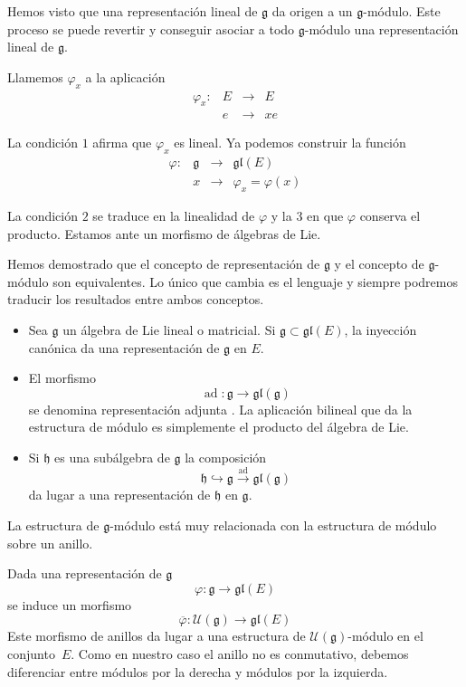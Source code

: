 \documentclass[a4paper,draft,12pt]{article}
\newcommand{\g}{\mathfrak{g}}%
\newcommand{\uni}{\mathcal{U}}%
\newcommand{\lto}{\longrightarrow}%
\newcommand{\df}[1]{\textsf{\color{blue}#1}}
\DeclareMathOperator{\ad}{ad}  %
\begin{document}
Hemos visto que una representación lineal de $\g$ da origen a un $\g$-módulo.  Este proceso se  puede revertir y conseguir asociar a todo $\g$-módulo una representación lineal de $\g$.

Llamemos $\varphi_x$ a la aplicación
$$
\begin{array}{cccl}
\varphi_x :&  E & \lto & E \\
  & e & \lto & xe
\end{array}
$$

La condición $1$ afirma que $\varphi_x$ es lineal. Ya podemos construir la función
$$
\begin{array}{cccl}
\varphi :&  \g & \lto & \mathfrak{gl}(E) \\
  & x & \lto & \varphi_x=\varphi(x)
\end{array}
$$

La condición $2$ se traduce en la linealidad de $\varphi$ y la $3$ en que $\varphi$ conserva el producto.  Estamos ante un morfismo de álgebras de Lie.

Hemos demostrado que el concepto de representación de $\g$ y el concepto de $\g$-módulo son equivalentes.  Lo único que cambia es el lenguaje y siempre podremos traducir los resultados entre ambos conceptos.

\bigskip


\begin{itemize}

\item Sea $\g$ un álgebra de Lie lineal o matricial.  Si $\g \subset \mathfrak{gl}(E)$, la inyección canónica  da una representación de $\g$ en $E$.

\item El morfismo
$$
\ad: \g \lto \mathfrak{gl}(\g)
$$
se denomina   \df{representación adjunta} .  La aplicación bilineal que da la estructura de módulo es simplemente el producto del álgebra de Lie.

\item Si $\mathfrak{h}$ es una subálgebra de $\g$ la composición
$$
\mathfrak{h} \hookrightarrow \g \stackrel{\ad}{\lto} \mathfrak{gl}(\g)
$$
da lugar a una representación de $\mathfrak{h}$ en $\g$.

\end{itemize}

La estructura de $\g$-módulo está muy relacionada con la estructura de módulo sobre un anillo.  

Dada una representación de $\g$
$$
\varphi: \g \lto \mathfrak{gl}(E)
$$
se induce un morfismo
$$
\overline{\varphi}: \uni (\g) \lto \mathfrak{gl}(E)
$$
Este morfismo de anillos da lugar a una estructura de $\uni(\g)$-módulo en el conjunto~$E$.  Como en nuestro caso el anillo no es conmutativo, debemos diferenciar entre módulos por la derecha y módulos por la izquierda.
\end{document}
